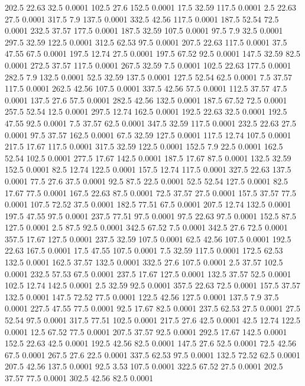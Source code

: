 202.5	22.63	32.5	0.0001
102.5	27.6	152.5	0.0001
17.5	32.59	117.5	0.0001
2.5	22.63	27.5	0.0001
317.5	7.9	137.5	0.0001
332.5	42.56	117.5	0.0001
187.5	52.54	72.5	0.0001
232.5	37.57	177.5	0.0001
187.5	32.59	107.5	0.0001
97.5	7.9	32.5	0.0001
297.5	32.59	122.5	0.0001
312.5	62.53	97.5	0.0001
207.5	22.63	117.5	0.0001
37.5	47.55	67.5	0.0001
197.5	12.74	27.5	0.0001
197.5	67.52	92.5	0.0001
147.5	32.59	82.5	0.0001
272.5	37.57	117.5	0.0001
267.5	32.59	7.5	0.0001
102.5	22.63	177.5	0.0001
282.5	7.9	132.5	0.0001
52.5	32.59	137.5	0.0001
127.5	52.54	62.5	0.0001
7.5	37.57	117.5	0.0001
262.5	42.56	107.5	0.0001
337.5	42.56	57.5	0.0001
112.5	37.57	47.5	0.0001
137.5	27.6	57.5	0.0001
282.5	42.56	132.5	0.0001
187.5	67.52	72.5	0.0001
257.5	52.54	12.5	0.0001
297.5	12.74	162.5	0.0001
192.5	22.63	32.5	0.0001
192.5	47.55	92.5	0.0001
7.5	37.57	62.5	0.0001
347.5	32.59	117.5	0.0001
232.5	22.63	27.5	0.0001
97.5	37.57	162.5	0.0001
67.5	32.59	127.5	0.0001
117.5	12.74	107.5	0.0001
217.5	17.67	117.5	0.0001
317.5	32.59	122.5	0.0001
152.5	7.9	22.5	0.0001
162.5	52.54	102.5	0.0001
277.5	17.67	142.5	0.0001
187.5	17.67	87.5	0.0001
132.5	32.59	152.5	0.0001
82.5	12.74	122.5	0.0001
157.5	12.74	117.5	0.0001
327.5	22.63	137.5	0.0001
77.5	27.6	37.5	0.0001
92.5	87.5	22.5	0.0001
52.5	52.54	127.5	0.0001
82.5	17.67	77.5	0.0001
167.5	22.63	87.5	0.0001
72.5	37.57	27.5	0.0001
157.5	37.57	77.5	0.0001
107.5	72.52	37.5	0.0001
182.5	77.51	67.5	0.0001
207.5	12.74	132.5	0.0001
197.5	47.55	97.5	0.0001
237.5	77.51	97.5	0.0001
97.5	22.63	97.5	0.0001
152.5	87.5	127.5	0.0001
2.5	87.5	92.5	0.0001
342.5	67.52	7.5	0.0001
342.5	27.6	72.5	0.0001
357.5	17.67	127.5	0.0001
237.5	32.59	107.5	0.0001
62.5	42.56	107.5	0.0001
192.5	22.63	167.5	0.0001
17.5	47.55	107.5	0.0001
7.5	32.59	117.5	0.0001
172.5	62.53	132.5	0.0001
162.5	37.57	132.5	0.0001
332.5	27.6	107.5	0.0001
2.5	37.57	102.5	0.0001
232.5	57.53	67.5	0.0001
237.5	17.67	127.5	0.0001
132.5	37.57	52.5	0.0001
102.5	12.74	142.5	0.0001
2.5	32.59	92.5	0.0001
357.5	22.63	72.5	0.0001
157.5	37.57	132.5	0.0001
147.5	72.52	77.5	0.0001
122.5	42.56	127.5	0.0001
137.5	7.9	37.5	0.0001
227.5	47.55	77.5	0.0001
92.5	17.67	82.5	0.0001
237.5	62.53	27.5	0.0001
27.5	52.54	97.5	0.0001
317.5	77.51	102.5	0.0001
217.5	27.6	42.5	0.0001
42.5	12.74	122.5	0.0001
12.5	67.52	77.5	0.0001
207.5	37.57	92.5	0.0001
292.5	17.67	142.5	0.0001
152.5	22.63	42.5	0.0001
192.5	42.56	82.5	0.0001
147.5	27.6	52.5	0.0001
72.5	42.56	67.5	0.0001
267.5	27.6	22.5	0.0001
337.5	62.53	97.5	0.0001
132.5	72.52	62.5	0.0001
207.5	42.56	137.5	0.0001
92.5	3.53	107.5	0.0001
322.5	67.52	27.5	0.0001
202.5	37.57	77.5	0.0001
302.5	42.56	82.5	0.0001
